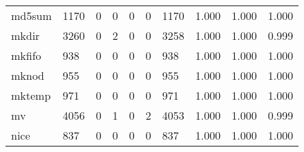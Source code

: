 \begin{longtable}{lp{2.0cm}p{2.0cm}p{2.0cm}p{2.0cm}p{2.0cm}p{2.0cm}p{2.0cm}p{2.0cm}p{2.0cm}}
md5sum    &                   1170 &                                  0 &                                 0 &                                0 &                                 0 &                            1170 &                                   1.000 &                                  1.000 &                                1.000 \\
mkdir     &                   3260 &                                  0 &                                 2 &                                0 &                                 0 &                            3258 &                                   1.000 &                                  1.000 &                                0.999 \\
mkfifo    &                    938 &                                  0 &                                 0 &                                0 &                                 0 &                             938 &                                   1.000 &                                  1.000 &                                1.000 \\
mknod     &                    955 &                                  0 &                                 0 &                                0 &                                 0 &                             955 &                                   1.000 &                                  1.000 &                                1.000 \\
mktemp    &                    971 &                                  0 &                                 0 &                                0 &                                 0 &                             971 &                                   1.000 &                                  1.000 &                                1.000 \\
mv        &                   4056 &                                  0 &                                 1 &                                0 &                                 2 &                            4053 &                                   1.000 &                                  1.000 &                                0.999 \\
nice      &                    837 &                                  0 &                                 0 &                                0 &                                 0 &                             837 &                                   1.000 &                                  1.000 &                                1.000 \\

\end{longtable}
